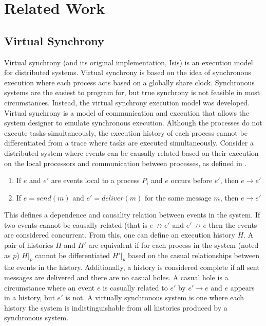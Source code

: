 \chapter{Related Work}
\section{Virtual Synchrony}
Virtual synchrony (and its original implementation, Isis) is an execution model for distributed systems. Virtual synchrony is based on the idea of synchronous execution where each process acts based on a globally share clock. Synchronous systems are the easiest to program for, but true synchrony is not feasible in most circumstances. Instead, the virtual synchrony execution model was developed. 
Virtual synchrony is a model of communication and execution that allows the system designer to emulate synchronous execution. Although the processes do not execute tasks simultaneously, the execution history of each process cannot be differentiated from a trace where tasks are executed simultaneously. 
Consider a distributed system where events can be causally related based on their execution on the local processors and communication between processes, as defined in \cite[p~.101]{ISISTOOLKIT}. 
\begin{enumerate}
    \item If $e$ and $e'$ are events local to a process $P_{i}$ and $e$ occurs before $e'$, then $e \rightarrow e'$
    \item If $e = send(m)$ and $e'=deliver(m)$ for the same message $m$, then $e \rightarrow e'$
\end{enumerate}
This defines a dependence and causality relation between events in the system. If two events cannot be causally related (that is $e \not\rightarrow e'$ and $e' \not\rightarrow e$ then the events are considered concurrent. From this, one can define an execution history $H$. A pair of histories $H$ and $H'$ are equivalent if for each process in the system (noted as $p$) $H|_{p}$ cannot be differentiated $H'|_{p}$ based on the casual relationships between the events in the history. \cite[p~.103]{ISISTOOLKIT} Additionally, a history is considered complete if all sent messages are delivered and there are no casual holes. A casual hole is a circumstance where an event $e$ is casually related to $e'$ by $e' \rightarrow e$ and $e$ appears in a history, but $e'$ is not. A virtually synchronous system is one where each history the system is indistinguishable from all histories produced by a synchronous system. \cite[p~.104]{ISISTOOLKIT}
